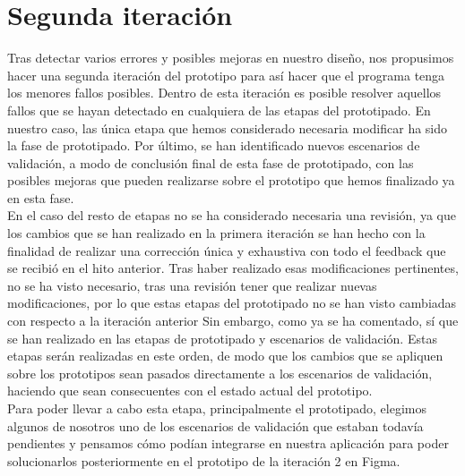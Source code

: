 









\section{Segunda iteración}
Tras detectar varios errores y posibles mejoras en nuestro diseño, nos propusimos hacer una segunda iteración del prototipo para así hacer que el programa tenga 
los menores fallos posibles. Dentro de esta iteración es posible resolver aquellos fallos que se hayan detectado en cualquiera de las etapas del prototipado. En nuestro
caso, las única etapa que hemos considerado necesaria modificar ha sido la fase de prototipado. Por último, se han identificado
nuevos escenarios de validación, a modo de conclusión final de esta fase de prototipado, con las posibles mejoras que pueden realizarse sobre el prototipo que hemos
finalizado ya en esta fase. \\

En el caso del resto de etapas no se ha considerado necesaria una revisión, ya que los cambios que se han realizado en la primera iteración se han hecho con la finalidad
de realizar una corrección única y exhaustiva con todo el feedback que se recibió en el hito anterior. Tras haber realizado esas modificaciones pertinentes, no se ha visto
necesario, tras una revisión tener que realizar nuevas modificaciones, por lo que estas etapas del prototipado no se han visto cambiadas con respecto a la iteración anterior Sin embargo, como
ya se ha comentado, sí que se han realizado en las etapas de prototipado y escenarios de validación. Estas etapas serán realizadas en este orden, de modo que
los cambios que se apliquen sobre los prototipos sean pasados directamente a los escenarios de validación, haciendo que sean consecuentes con el estado actual del prototipo. \\

Para poder llevar a cabo esta etapa, principalmente el prototipado, elegimos algunos de nosotros uno de los escenarios de validación que estaban todavía pendientes y pensamos
cómo podían integrarse en nuestra aplicación para poder solucionarlos posteriormente en el prototipo de la iteración 2 en Figma.

